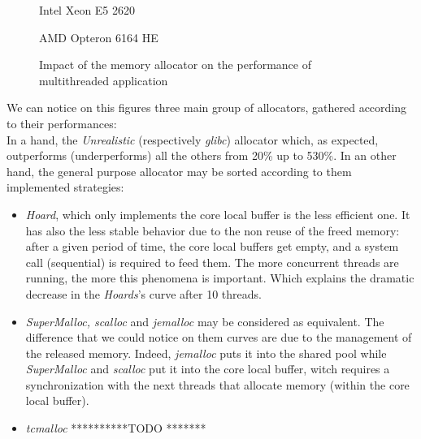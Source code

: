 \documentclass[10pt]{article}											%
\begin{document}
\begin{figure*}[!htb]\centering
	\begin{minipage}{0.35\textwidth}
        \caption{Intel Xeon E5 2620}
	\end{minipage}
	\begin{minipage}{0.35\textwidth}
        \caption{AMD Opteron 6164 HE}
	\end{minipage}
	\caption{Impact of the memory allocator on the performance of multithreaded application}
	\label{allocatorComparison.png}
\end{figure*}

We can notice on this figures three main group of allocators, gathered according to their performances:\\
In a hand, the \textit{Unrealistic} (respectively \textit{glibc}) allocator which, as expected, outperforms (underperforms) all the others from 20\% up to 530\%.   In an other hand, the general purpose allocator may be sorted according to them implemented strategies:
\begin{itemize}
	\item \textit{Hoard}, which only implements the core local buffer is the less efficient one.   It has also the less stable behavior due to the non reuse of the freed memory: after a given period of time, the core local buffers get empty, and a system call (sequential) is required to feed them.   The more concurrent threads are running, the more this phenomena is important.  Which explains the dramatic decrease in the \textit{Hoards}'s curve after 10 threads.
	\item \textit{SuperMalloc, scalloc} and \textit{jemalloc} may be considered as equivalent.   The difference that we could notice on them curves are due to the management of the released memory.   Indeed, \textit{jemalloc} puts it into the shared pool while \textit{SuperMalloc} and \textit{scalloc} put it into the core local buffer, witch requires a synchronization with the next threads that allocate memory (within the core local buffer).
	\item \textit{tcmalloc} **********TODO *******
\end{itemize}


\end{document}
